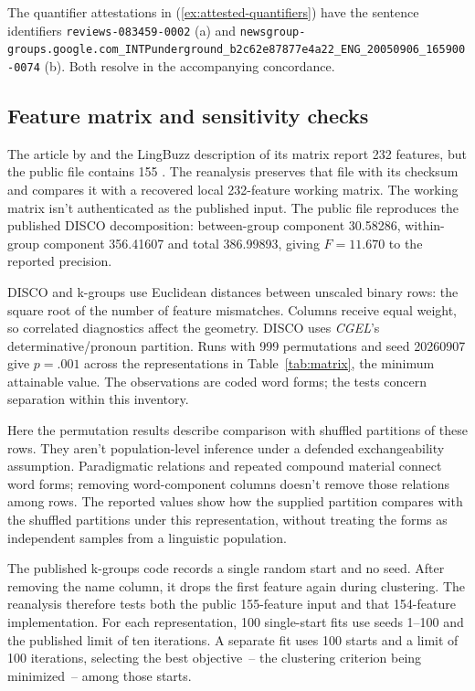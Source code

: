 \documentclass[12pt]{article}
\begin{document}
The quantifier attestations in (\ref{ex:attested-quantifiers}) have the sentence identifiers \nolinkurl{reviews-083459-0002} (a) and \nolinkurl{newsgroup-groups.google.com_INTPunderground_b2c62e87877e4a22_ENG_20050906_165900-0074} (b). Both resolve in the accompanying concordance.

\subsection{Feature matrix and sensitivity checks}

The article by \textcite{reynolds2021} and the LingBuzz description of its matrix report 232 features, but the public file contains 155 \citep{reynolds2021matrixpublic}. The reanalysis preserves that file with its checksum and compares it with a recovered local 232-feature working matrix. The working matrix isn't authenticated as the published input. The public file reproduces the published DISCO decomposition: between-group component 30.58286, within-group component 356.41607 and total 386.99893, giving $F=11.670$ to the reported precision.

DISCO and k-groups use Euclidean distances between unscaled binary rows: the square root of the number of feature mismatches. Columns receive equal weight, so correlated diagnostics affect the geometry. DISCO uses \textit{CGEL}'s determinative/pronoun partition. Runs with 999 permutations and seed 20260907 give \mbox{$p=.001$} across the representations in Table~\ref{tab:matrix}, the minimum attainable value. The observations are coded word forms; the tests concern separation within this inventory.

Here the permutation results describe comparison with shuffled partitions of these rows. They aren't population-level inference under a defended exchangeability assumption. Paradigmatic relations and repeated compound material connect word forms; removing word-component columns doesn't remove those relations among rows. The reported values show how the supplied partition compares with the shuffled partitions under this representation, without treating the forms as independent samples from a linguistic population.

The published k-groups code records a single random start and no seed. After removing the name column, it drops the first feature again during clustering. The reanalysis therefore tests both the public 155-feature input and that 154-feature implementation. For each representation, 100 single-start fits use seeds 1--100 and the published limit of ten iterations. A separate fit uses 100 starts and a limit of 100 iterations, selecting the best objective~-- the clustering criterion being minimized~-- among those starts.
\end{document}
